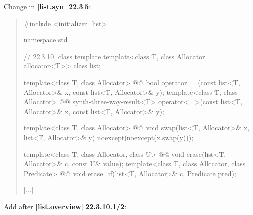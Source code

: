 \documentclass{wg21}
\begin{document}
Change in \textbf{[list.syn] 22.3.5}:
\begin{quote}
\begin{codeblock}
#include <initializer_list>

namespace std {
  // 22.3.10, class template 
  template<class T, class Allocator = allocator<T>> class list;

  template<class T, class Allocator>
    @@ bool operator==(const list<T, Allocator>& x, const list<T, Allocator>& y);
  template<class T, class Allocator>
    @@ synth-three-way-result<T> operator<=>(const list<T, Allocator>& x, const list<T, Allocator>& y);

  template<class T, class Allocator>
    @@ void swap(list<T, Allocator>& x, list<T, Allocator>& y)
      noexcept(noexcept(x.swap(y)));
      
  template<class T, class Allocator, class U>
    @@ void erase(list<T, Allocator>& c, const U& value);
  template<class T, class Allocator, class Predicate>
    @@ void erase_if(list<T, Allocator>& c, Predicate pred);    

  [...]
}
\end{codeblock}
\end{quote}

Add after \textbf{[list.overview] 22.3.10.1/2}:
\begin{quote}
\end{quote}
\end{document}
